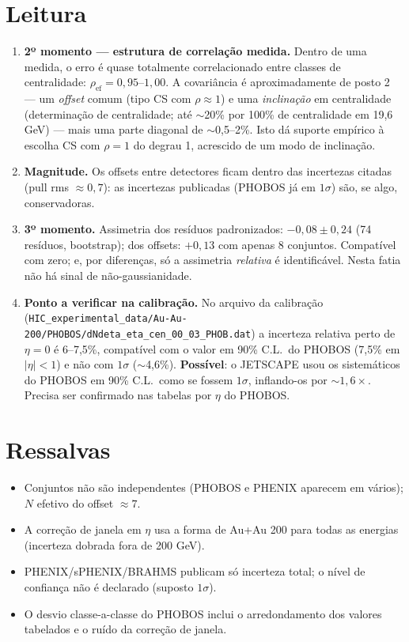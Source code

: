 \documentclass[11pt,a4paper]{article}
\newcommand{\arq}[1]{\texttt{\nolinkurl{#1}}}
\begin{document}
\section*{Leitura}
\begin{enumerate}
\item \textbf{2º momento --- estrutura de correlação medida.} Dentro de uma medida, o erro é quase totalmente correlacionado
entre classes de centralidade: $\rho_{\mathrm{ef}}=0{,}95$--$1{,}00$. A covariância é aproximadamente de posto 2
--- um \emph{offset} comum (tipo CS com $\rho\approx1$) e uma \emph{inclinação} em centralidade (determinação de centralidade;
até $\sim$20\% por 100\% de centralidade em 19,6 GeV) --- mais uma parte diagonal de $\sim$0,5--2\%.
Isto dá suporte empírico à escolha CS com $\rho=1$ do degrau 1, acrescido de um modo de inclinação.
\item \textbf{Magnitude.} Os offsets entre detectores ficam dentro das incertezas citadas (pull rms $\approx0{,}7$):
as incertezas publicadas (PHOBOS já em $1\sigma$) são, se algo, conservadoras.
\item \textbf{3º momento.} Assimetria dos resíduos padronizados: $-0{,}08\pm0{,}24$ (74 resíduos, bootstrap); dos offsets:
$+0{,}13$ com apenas 8 conjuntos. Compatível com zero; e, por diferenças, só a assimetria \emph{relativa} é identificável.
Nesta fatia não há sinal de não-gaussianidade.
\item \textbf{Ponto a verificar na calibração.} No arquivo da calibração (\arq{HIC_experimental_data/Au-Au-200/PHOBOS/dNdeta_eta_cen_00_03_PHOB.dat})
a incerteza relativa perto de $\eta=0$ é 6--7,5\%, compatível com o valor em 90\% C.L.\ do PHOBOS (7,5\% em $|\eta|<1$) e não
com $1\sigma$ ($\sim$4,6\%). \textbf{Possível}: o JETSCAPE usou os sistemáticos do PHOBOS em 90\% C.L.\ como se fossem $1\sigma$,
inflando-os por $\sim1{,}6\times$. Precisa ser confirmado nas tabelas por $\eta$ do PHOBOS.
\end{enumerate}

\section*{Ressalvas}
\begin{itemize}[nosep]
\item Conjuntos não são independentes (PHOBOS e PHENIX aparecem em vários); $N$ efetivo do offset $\approx7$.
\item A correção de janela em $\eta$ usa a forma de Au+Au 200 para todas as energias (incerteza dobrada fora de 200 GeV).
\item PHENIX/sPHENIX/BRAHMS publicam só incerteza total; o nível de confiança não é declarado (suposto $1\sigma$).
\item O desvio classe-a-classe do PHOBOS inclui o arredondamento dos valores tabelados e o ruído da correção de janela.
\end{itemize}
\end{document}
